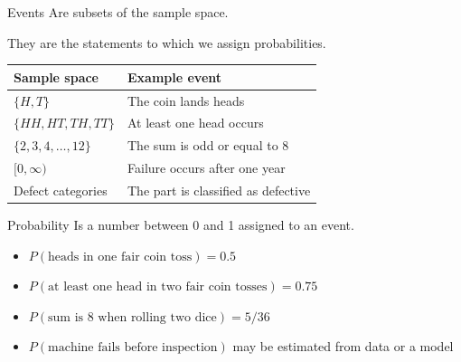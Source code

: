 \documentclass[12pt]{beamer}
\begin{document}
\begin{frame}{}
\begin{block}{Events}
Are subsets of the sample space.

They are the statements to which we assign probabilities.

\vspace{0.3cm}
\begin{tabular}{>{\raggedright\arraybackslash}p{} >{\raggedright\arraybackslash}p{}}
\toprule
Sample space & Example event \\
\midrule
$\{H,T\}$ & The coin lands heads \\
$\{HH, HT, TH, TT\}$ & At least one head occurs \\
$\{2,3,4,\ldots,12\}$ & The sum is odd or equal to 8 \\
$[0,\infty)$ & Failure occurs after one year \\
Defect categories & The part is classified as defective \\
\bottomrule
\end{tabular}
\end{block}
\end{frame}

\begin{frame}{}
\begin{block}{Probability}
Is a number between 0 and 1 assigned to an event.

\vspace{0.4cm}
\begin{itemize}
  \item $P(\text{heads in one fair coin toss}) = 0.5$
  \item $P(\text{at least one head in two fair coin tosses}) = 0.75$
  \item $P(\text{sum is 8 when rolling two dice}) = 5/36$
  \item $P(\text{machine fails before inspection})$ may be estimated from data or a model
\end{itemize}
\end{block}
\end{frame}
\end{document}
